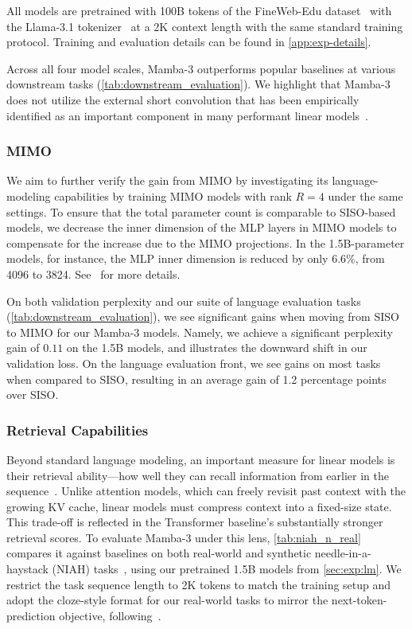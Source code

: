 \documentclass{article}
\newcommand{\citep}{\parencite}
\newcommand{\citet}{\textcite}
\theoremstyle{plain}
\theoremstyle{definition}
\theoremstyle{remark}
\begin{document}
All models are pretrained with 100B tokens of the FineWeb-Edu dataset~\citep{penedo2024finewebdatasetsdecantingweb} with the Llama-3.1 tokenizer~\citep{grattafiori2024llama3herdmodels} at a 2K context length with the same standard training protocol. Training and evaluation details can be found in \cref{app:exp-details}.

Across all four model scales, Mamba-3 outperforms popular baselines at various downstream tasks (\cref{tab:downstream_evaluation}).
We highlight that Mamba-3 does not utilize the
external short convolution that has been empirically identified as an important component in many performant linear models~\citep{gu2024mambalineartimesequencemodeling,yang2025gateddeltanetworksimproving,allen2025canon}.

\subsubsection{MIMO}
We aim to further verify the gain from MIMO by investigating its language-modeling capabilities by training MIMO models with rank $R=4$ under the same settings.
To ensure that the total parameter count is comparable to SISO-based models, we decrease the inner dimension of the MLP layers in MIMO models to compensate for the increase due to the MIMO projections.
In the 1.5B-parameter models, for instance, the MLP inner dimension is reduced by only $6.6\%$, from 4096 to 3824. See~ for more details.

On both validation perplexity and our suite of language evaluation tasks (\cref{tab:downstream_evaluation}), we see significant gains when moving from SISO to MIMO for our Mamba-3 models. Namely, we achieve a significant perplexity gain of $0.11$ on the 1.5B models, and  illustrates the downward shift in our validation loss. On the language evaluation front, we see gains on most tasks when compared to SISO, resulting in an average gain of 1.2 percentage points over SISO.

\subsubsection{Retrieval Capabilities}
\label{sec:exp:retrieval}
Beyond standard language modeling, an important measure for linear models is their retrieval ability---how well they can recall information from earlier in the sequence~\citep{arora2025mechanisticevaluationtransformersstate,arora2025simplelinearattentionlanguage}. Unlike attention models, which can freely revisit past context with the growing KV cache, linear models must compress context into a fixed-size state. This trade-off is reflected in the Transformer baseline's substantially stronger retrieval scores.  
To evaluate Mamba-3 under this lens, \cref{tab:niah_n_real} compares it against baselines on both real-world and synthetic needle-in-a-haystack (NIAH) tasks~\citep{hsieh2024rulerwhatsrealcontext}, using our pretrained 1.5B models from \cref{sec:exp:lm}. We restrict the task sequence length to 2K tokens to match the training setup and adopt the cloze-style format for our real-world tasks to mirror the next-token-prediction objective, following~\citet{arora2025simplelinearattentionlanguage,arora2024justreadtwiceclosing}.
\end{document}
